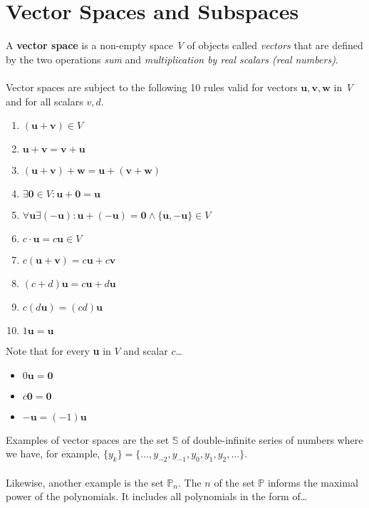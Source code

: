 \documentclass[12pt]{article}
\newcommand{\bt}[1]{\textbf{{#1}}}
\newcommand{\bm}[1]{\mathbf{{#1}}}
\begin{document}
\fi

\section*{Vector Spaces and Subspaces}

A \bt{vector space} is a non-empty space \emph{V} of objects called \emph{vectors} that are defined
by the two operations \emph{sum} and \emph{multiplication by real scalars (real numbers)}. \\ \\

Vector spaces are subject to the following 10 rules valid for vectors $\bm{u, v, w}$ in \emph{V} and for all
scalars $v,d$.

\begin{enumerate}
    \item $\bm{(u + v)} \in V$
    \item $\bm{u + v = v + u}$
    \item $\bm{(u + v) + w = u + (v + w)}$
    \item $\exists \bm{0} \in V: \bm{u + 0 = u}$
    \item $\forall \bm{u} \exists (\bm{-u}): \bm{u + (-u) = 0} \land \{\bm{u, -u}\} \in V$
    \item $c \cdot \bm{u} = c\bm{u} \in V$
    \item $c(\bm{u + v}) = c\bm{u} + c\bm{v}$
    \item $(c + d)\bm{u} = c\bm{u} + d\bm{u}$
    \item $c(d\bm{u}) = (cd)\bm{u}$
    \item $1\bm{u} = \bm{u}$
\end{enumerate}

Note that for every \bt{u} in $V$ and scalar $c$\dots

\begin{itemize}
    \item $0\bm{u} = \bm{0}$
    \item $c\bm{0} = \bm{0}$
    \item $\bm{-u} = (-1)\bm{u}$
\end{itemize}

Examples of vector spaces are the set $\mathbb{S}$ of double-infinite series of numbers
where we have, for example, $\{y_k\} = \{\dots, y_{-2}, y_{-1}, y_0, y_{1}, y_{2}, \dots \}$. \\ \\

Likewise, another example is the set $\mathbb{P}_n$. The $n$ of the set $\mathbb{P}$ informs the maximal power of the polynomials.
It includes all polynomials in the form of\dots
\end{document}
